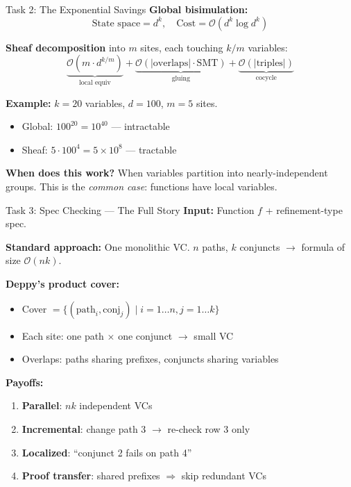 \documentclass[aspectratio=169,10pt]{beamer}
\begin{document}
\begin{frame}{Task 2: The Exponential Savings}
\textbf{Global bisimulation:}
\[
\text{State space} = d^k, \quad \text{Cost} = \mathcal{O}(d^k \log d^k)
\]

\textbf{Sheaf decomposition} into $m$ sites, each touching $k/m$ variables:
\[
\underbrace{\mathcal{O}(m \cdot d^{k/m})}_{\text{local equiv}} + \underbrace{\mathcal{O}(|\text{overlaps}| \cdot \text{SMT})}_{\text{gluing}} + \underbrace{\mathcal{O}(|\text{triples}|)}_{\text{cocycle}}
\]

\textbf{Example:} $k = 20$ variables, $d = 100$, $m = 5$ sites.
\begin{itemize}
  \item Global: $100^{20} = 10^{40}$ --- intractable
  \item Sheaf: $5 \cdot 100^4 = 5 \times 10^8$ --- tractable
\end{itemize}

\textbf{When does this work?} When variables partition into nearly-independent groups. This is the \emph{common case}: functions have local variables.
\end{frame}

\begin{frame}{Task 3: Spec Checking — The Full Story}
\textbf{Input:} Function $f$ + refinement-type spec.

\textbf{Standard approach:} One monolithic VC.
$n$ paths, $k$ conjuncts $\to$ formula of size $\mathcal{O}(nk)$.

\textbf{Deppy's product cover:}
\begin{itemize}
  \item Cover $= \{(\text{path}_i, \text{conj}_j) \mid i = 1\ldots n, j = 1\ldots k\}$
  \item Each site: one path $\times$ one conjunct $\to$ small VC
  \item Overlaps: paths sharing prefixes, conjuncts sharing variables
\end{itemize}

\textbf{Payoffs:}
\begin{enumerate}
  \item \textbf{Parallel}: $nk$ independent VCs
  \item \textbf{Incremental}: change path 3 $\to$ re-check row 3 only
  \item \textbf{Localized}: ``conjunct 2 fails on path 4''
  \item \textbf{Proof transfer}: shared prefixes $\Rightarrow$ skip redundant VCs
\end{enumerate}
\end{frame}
\end{document}
